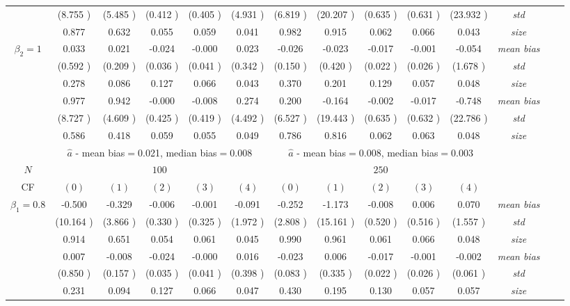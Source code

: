 \begin{table}
\begin{threeparttable}
{\begin{tabular}{|c|c|c|c|c|c|c|c|c|c|c|c|c|c|}
&(8.755 )&(5.485 )&(0.412 )&(0.405 )&(4.931 )&(6.819 )&(20.207 )&(0.635 )&(0.631 )&(23.932 )&\textit{std}\\ 
& 0.877 & 0.632 &0.055 &0.059 &0.041 &0.982& 0.915 &0.062 &0.066& 0.043 &\textit{size} \\ \midrule 
\multirow{4}{*}{$\beta_2=1$}& 0.033 & 0.021 &-0.024 &-0.000 &0.023 &-0.026& -0.023 &-0.017 &-0.001& -0.054 &\textit{mean bias} \\ 
&(0.592 )&(0.209 )&(0.036 )&(0.041 )&(0.342 )&(0.150 )&(0.420 )&(0.022 )&(0.026 )&(1.678 )&\textit{std}\\ 
& 0.278 & 0.086 &0.127 &0.066 &0.043 &0.370& 0.201 &0.129& 0.057 &0.048 &\textit{size} \\\midrule 
\multirow{4}{*}{$\beta_3=1$}& 0.977 & 0.942 &-0.000& -0.008 &0.274 &0.200 &-0.164 &-0.002 &-0.017& -0.748 &\textit{mean bias} \\ 
&(8.727 )&(4.609 )&(0.425 )&(0.419 )&(4.492 )&(6.527 )&(19.443 )&(0.635 )&(0.632 )&(22.786 )&\textit{std}\\ 
& 0.586 & 0.418 &0.059 &0.055 &0.049 &0.786& 0.816& 0.062 &0.063 &0.048 &\textit{size} \\\midrule 
&\multicolumn{5}{|c|}{$\hat{a}$ - mean bias$=$0.021, median bias$=$0.008 }&\multicolumn{5}{|c|}{$\hat{a}$ - mean bias$=$0.008, median bias$=$0.003 }&\\ \hline 
\cellcolor{yellow}$N$&\multicolumn{5}{|c|}{\cellcolor{yellow}$100$}&\multicolumn{5}{|c|}{\cellcolor{yellow}$250$}&\\\hline 
CF&$(0)$&$(1)$&$(2)$&$(3)$&$(4)$& $(0)$ &$(1)$&$(2)$&$(3)$&$(4)$&\\\hline 
\multirow{4}{*}{$\beta_1=0.8$}& -0.500 & -0.329 &-0.006 &-0.001 &-0.091 &-0.252& -1.173 &-0.008 &0.006& 0.070 &\textit{mean bias} \\ 
&(10.164 )&(3.866 )&(0.330 )&(0.325 )&(1.972 )&(2.808 )&(15.161 )&(0.520 )&(0.516 )&(1.557 )&\textit{std}\\ 
& 0.914 & 0.651 &0.054 &0.061 &0.045 &0.990& 0.961 &0.061 &0.066& 0.048 &\textit{size} \\\midrule 
\multirow{4}{*}{$\beta_2=1$}& 0.007 & -0.008 &-0.024 &-0.000 &0.016 &-0.023& 0.006 &-0.017 &-0.001& -0.002 &\textit{mean bias} \\ 
&(0.850 )&(0.157 )&(0.035 )&(0.041 )&(0.398 )&(0.083 )&(0.335 )&(0.022 )&(0.026 )&(0.061 )&\textit{std}\\ 
& 0.231 & 0.094 &0.127 &0.066 &0.047 &0.430& 0.195 &0.130& 0.057 &0.057 &\textit{size} \\ \midrule

\end{tabular}}
\end{threeparttable}
\end{table}
